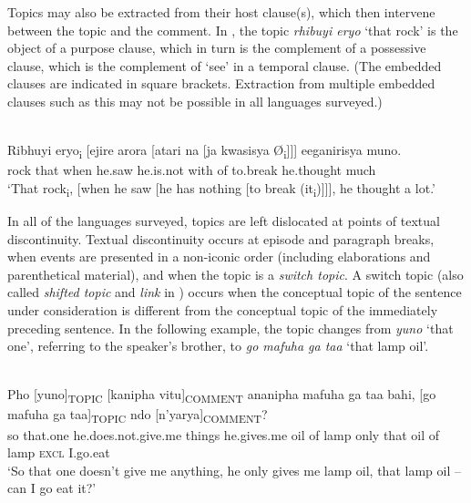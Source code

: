 \documentclass[output=paper]{langsci/langscibook}
\begin{document}
Topics may also be extracted from their host clause(s), which then intervene between the topic and the comment. In , the topic \textit{rhibuyi eryo} ‘that rock’ is the object of a purpose clause, which in turn is the complement of a possessive clause, which is the complement of ‘see’ in a temporal clause. (The embedded clauses are indicated in square brackets. Extraction from multiple embedded clauses such as this may not be possible in all languages surveyed.)

\ea\label{ex:6.nicolle} 
\\
\gll Ribhuyi eryo\textsubscript{i} [ejire arora [atari na [ja kwasisya Ø\textsubscript{i}]]] eeganirisya muno.\\
rock that {\db}when he.saw he.is.not with {\db}of to.break he.thought much\\
\glt ‘\textup{That rock}\textsubscript{i}\textup{, [when he saw [he has nothing [to break (it}\textsubscript{i}\textup{)]]], he thought a}\textup{ lot.’}
\z

In all of the languages surveyed, topics are left dislocated at points of textual discontinuity. Textual discontinuity occurs at episode and paragraph breaks, when events are presented in a non-iconic order (including elaborations and parenthetical material), and when the topic is a \textit{switch topic}. A switch topic (also called \textit{shifted topic} and \textit{link} in \citealt[109--110]{vallduvi1992}) occurs when the conceptual topic of the sentence under consideration is different from the conceptual topic of the immediately preceding sentence. In the following example, the topic changes from \textit{yuno} ‘that one’, referring to the speaker’s brother, to \textit{go mafuha ga taa} ‘that lamp oil’.

\ea\label{ex:7.nicolle}
\\
\gll Pho [yuno]\textsubscript{TOPIC} [kanipha vitu]\textsubscript{COMMENT} ananipha mafuha ga taa bahi, [go mafuha ga taa]\textsubscript{TOPIC} ndo [n’yarya]\textsubscript{COMMENT}?\\
so {\db}that.one {\db}he.does.not.give.me things he.gives.me oil of lamp only {\db}that oil of lamp \textsc{excl} {\db}I.go.eat\\
\glt \textup{‘So t}\textup{hat one doesn’t give me anything, he only gives me lamp oil, that lamp oil -- can I g}\textup{o eat it?’}
\z
\end{document}
